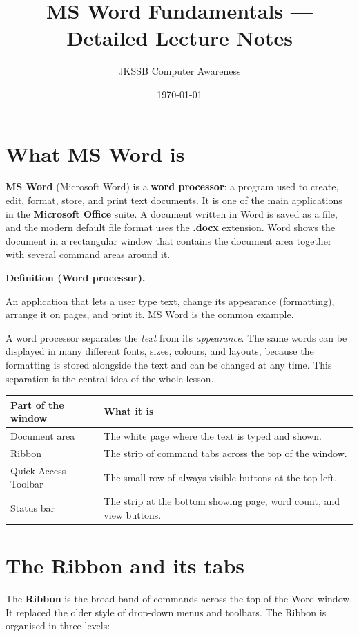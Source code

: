 \documentclass[11pt]{article}
\title{MS Word Fundamentals --- Detailed Lecture Notes}
\author{JKSSB Computer Awareness}
\date{\today}
\newenvironment{definitionbox}[1]{%
  \par\noindent\textbf{Definition (#1).}\ \itshape
}{\par\vspace{0.3em}}
\begin{document}
\maketitle

\section{What MS Word is}
\textbf{MS Word} (Microsoft Word) is a \textbf{word processor}: a program
used to create, edit, format, store, and print text documents. It is one of
the main applications in the \textbf{Microsoft Office} suite. A document
written in Word is saved as a file, and the modern default file format uses
the \textbf{.docx} extension. Word shows the document in a rectangular
window that contains the document area together with several command areas
around it.

\begin{definitionbox}{Word processor}
An application that lets a user type text, change its appearance
(formatting), arrange it on pages, and print it. MS Word is the common
example.
\end{definitionbox}

A word processor separates the \emph{text} from its \emph{appearance}. The
same words can be displayed in many different fonts, sizes, colours, and
layouts, because the formatting is stored alongside the text and can be
changed at any time. This separation is the central idea of the whole
lesson.

\begin{center}
\begin{tabular}{p{}p{}}
\toprule
\textbf{Part of the window} & \textbf{What it is} \\
\midrule
Document area & The white page where the text is typed and shown. \\
Ribbon & The strip of command tabs across the top of the window. \\
Quick Access Toolbar & The small row of always-visible buttons at the top-left. \\
Status bar & The strip at the bottom showing page, word count, and view buttons. \\
\bottomrule
\end{tabular}
\end{center}

\section{The Ribbon and its tabs}
The \textbf{Ribbon} is the broad band of commands across the top of the Word
window. It replaced the older style of drop-down menus and toolbars. The
Ribbon is organised in three levels:
\end{document}

